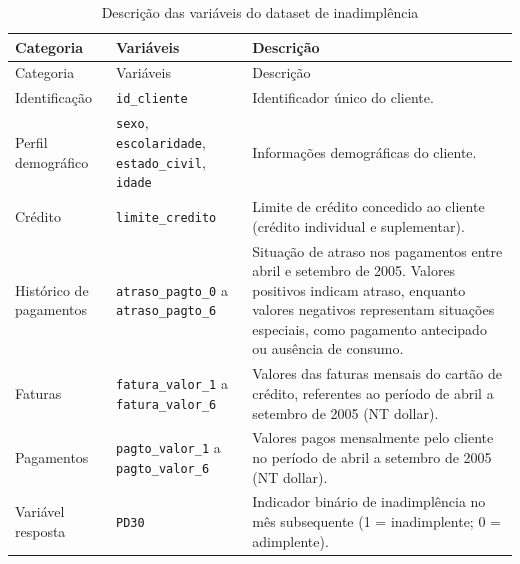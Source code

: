 \documentclass[
  brazilian,
  12pt,
  letterpaper,
  DIV=11,
  numbers=noendperiod]{scrartcl}
\begin{document}
\begin{longtable}[]{@{}
  >{\raggedright\arraybackslash}p{}
  >{\raggedright\arraybackslash}p{}
  >{\raggedright\arraybackslash}p{}@{}}
\caption{Descrição das variáveis do dataset de
inadimplência}\label{tbl-descricao-inadimplencia}\tabularnewline
\toprule\noalign{}
\begin{minipage}[b]{\linewidth}\raggedright
Categoria
\end{minipage} & \begin{minipage}[b]{\linewidth}\raggedright
Variáveis
\end{minipage} & \begin{minipage}[b]{\linewidth}\raggedright
Descrição
\end{minipage} \\
\midrule\noalign{}
\endfirsthead
\toprule\noalign{}
\begin{minipage}[b]{\linewidth}\raggedright
Categoria
\end{minipage} & \begin{minipage}[b]{\linewidth}\raggedright
Variáveis
\end{minipage} & \begin{minipage}[b]{\linewidth}\raggedright
Descrição
\end{minipage} \\
\midrule\noalign{}
\endhead
\bottomrule\noalign{}
\endlastfoot
Identificação & \texttt{id\_cliente} & Identificador único do
cliente. \\
Perfil demográfico & \texttt{sexo}, \texttt{escolaridade},
\texttt{estado\_civil}, \texttt{idade} & Informações demográficas do
cliente. \\
Crédito & \texttt{limite\_credito} & Limite de crédito concedido ao
cliente (crédito individual e suplementar). \\
Histórico de pagamentos & \texttt{atraso\_pagto\_0} a
\texttt{atraso\_pagto\_6} & Situação de atraso nos pagamentos entre
abril e setembro de 2005. Valores positivos indicam atraso, enquanto
valores negativos representam situações especiais, como pagamento
antecipado ou ausência de consumo. \\
Faturas & \texttt{fatura\_valor\_1} a \texttt{fatura\_valor\_6} &
Valores das faturas mensais do cartão de crédito, referentes ao período
de abril a setembro de 2005 (NT dollar). \\
Pagamentos & \texttt{pagto\_valor\_1} a \texttt{pagto\_valor\_6} &
Valores pagos mensalmente pelo cliente no período de abril a setembro de
2005 (NT dollar). \\
Variável resposta & \texttt{PD30} & Indicador binário de inadimplência
no mês subsequente (1 = inadimplente; 0 = adimplente). \\
\end{longtable}
\end{document}
